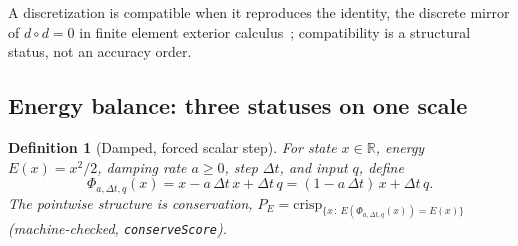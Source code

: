 \documentclass[11pt,a4paper]{article}
\newtheorem{definition}[theorem]{Definition}
\newcommand{\Real}{\mathbb{R}}
\begin{document}
A discretization is compatible when it reproduces the identity, the
discrete mirror of $d \circ d = 0$ in finite element exterior
calculus~\cite{arnold2006}; compatibility is a structural status, not
an accuracy order.

\subsection{Energy balance: three statuses on one scale}

\begin{definition}[Damped, forced scalar step]
\label{def:energy}
For state $x \in \Real$, energy $E(x) = x^2/2$, damping rate
$a \ge 0$, step $\Delta t$, and input $q$, define
\[
  \Phi_{a, \Delta t, q}(x) = x - a\,\Delta t\,x + \Delta t\,q
  = (1 - a\,\Delta t)\,x + \Delta t\,q .
\]
The pointwise structure is conservation,
$P_{E} = \mathrm{crisp}_{\{x \,:\, E(\Phi_{a,\Delta t,q}(x)) = E(x)\}}$
(machine-checked, \texttt{conserveScore}).
\end{definition}
\end{document}
